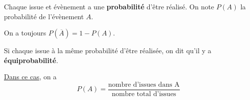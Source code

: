 \documentclass[noheader]{coursclass}
\begin{document}
\begin{definition}[Probabilités]
	Chaque issue et évènement a une \textbf{probabilité} d'être réalisé. On note $P(A)$ la probabilité de l'évènement $A$.
\end{definition}

\begin{remarque}
	On a toujours $P(\overline{A}) = 1 - P(A)$.
\end{remarque}

\begin{propriete}[Probabilités]
	Si chaque issue à la même probabilité d'être réalisée, on dit qu'il y a \textbf{équiprobabilité}.

	\uline{Dans ce cas}, on a
	$$ P(A) = \dfrac{\text{nombre d'issues dans A}}{\text{nombre total d'issues}} $$
\end{propriete}
\end{document}
